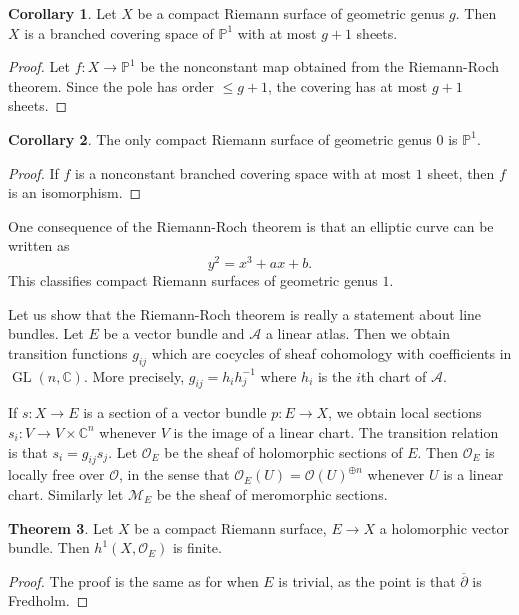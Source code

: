 \documentclass[12pt]{book}
\newcommand{\CC}{\mathbb{C}}
\newcommand{\PP}{\mathbb{P}}
\newcommand{\Mero}{\mathscr M}
\newcommand{\Olo}{\mathscr O}
\DeclareMathOperator{\GL}{GL}
\newcommand{\dbar}{\overline\partial}
\theoremstyle{definition}
\newtheorem{theorem}{Theorem}[chapter]
\newtheorem{corollary}[theorem]{Corollary}
\begin{document}
\begin{corollary}
Let $X$ be a compact Riemann surface of geometric genus $g$.
Then $X$ is a branched covering space of $\PP^1$ with at most $g + 1$ sheets.
\end{corollary}
\begin{proof}
Let $f: X \to \PP^1$ be the nonconstant map obtained from the Riemann-Roch theorem.
Since the pole has order $\leq g + 1$, the covering has at most $g + 1$ sheets.
\end{proof}

\begin{corollary}
The only compact Riemann surface of geometric genus $0$ is $\PP^1$.
\end{corollary}
\begin{proof}
If $f$ is a nonconstant branched covering space with at most $1$ sheet, then $f$ is an isomorphism.
\end{proof}

One consequence of the Riemann-Roch theorem is that an elliptic curve can be written as
$$y^2 = x^3 + ax + b.$$
This classifies compact Riemann surfaces of geometric genus $1$.

Let us show that the Riemann-Roch theorem is really a statement about line bundles.
Let $E$ be a vector bundle and $\mathscr A$ a linear atlas.
Then we obtain transition functions $g_{ij}$ which are cocycles of sheaf cohomology with coefficients in $\GL(n, \CC)$.
More precisely, $g_{ij} = h_i h_j^{-1}$ where $h_i$ is the $i$th chart of $\mathscr A$.

If $s: X \to E$ is a section of a vector bundle $p: E \to X$, we obtain local sections $s_i: V \to V \times \CC^n$ whenever $V$ is the image of a linear chart.
The transition relation is that $s_i = g_{ij}s_j$.
Let $\Olo_E$ be the sheaf of holomorphic sections of $E$.
Then $\Olo_E$ is locally free over $\Olo$, in the sense that $\Olo_E(U) = \Olo(U)^{\oplus n}$ whenever $U$ is a linear chart.
Similarly let $\Mero_E$ be the sheaf of meromorphic sections.

\begin{theorem}
Let $X$ be a compact Riemann surface, $E \to X$ a holomorphic vector bundle.
Then $h^1(X, \Olo_E)$ is finite.
\end{theorem}
\begin{proof}
The proof is the same as for when $E$ is trivial, as the point is that $\dbar$ is Fredholm.
\end{proof}
\end{document}
